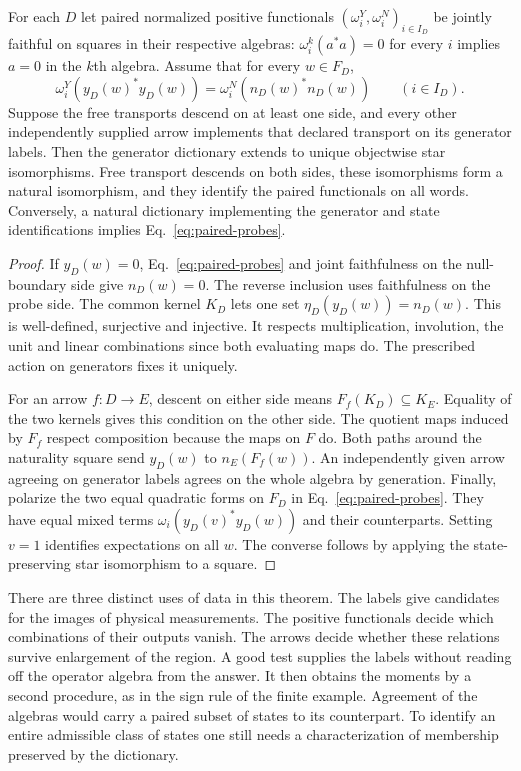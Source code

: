 \documentclass[11pt,letterpaper]{article}
\begin{document}
\begin{theorem}
\label{thm:reconstruction}
For each \(D\) let paired normalized positive functionals
\((\omega^Y_i,\omega^N_i)_{i\in I_D}\) be jointly faithful on squares in
their respective algebras: \(\omega^k_i(a^*a)=0\) for every \(i\) implies
\(a=0\) in the \(k\)th algebra. Assume that for every \(w\in F_D\),
\begin{equation}
 \omega^Y_i(y_D(w)^*y_D(w))=
 \omega^N_i(n_D(w)^*n_D(w))\qquad(i\in I_D).
 \label{eq:paired-probes}
\end{equation}
Suppose the free transports descend on at least one side, and every
other independently supplied arrow implements that declared transport
on its generator labels. Then the generator dictionary extends to unique
objectwise star isomorphisms. Free transport descends on both sides, these
isomorphisms form a natural isomorphism, and they identify the paired
functionals on all words. Conversely, a natural dictionary implementing
the generator and state identifications implies Eq.~\eqref{eq:paired-probes}.
\end{theorem}
\begin{proof}
If \(y_D(w)=0\), Eq.~\eqref{eq:paired-probes} and joint faithfulness on
the null-boundary side give \(n_D(w)=0\). The reverse inclusion uses
faithfulness on the probe side. The common kernel \(K_D\) lets one set
\(\eta_D(y_D(w))=n_D(w)\). This is well-defined, surjective and injective.
It respects multiplication, involution, the unit and linear combinations
since both evaluating maps do. The prescribed action on generators fixes
it uniquely.

For an arrow \(f:D\to E\), descent on either side means
\(F_f(K_D)\subseteq K_E\). Equality of the two kernels gives this
condition on the other side. The quotient maps induced by \(F_f\)
respect composition because the maps on \(F\) do. Both paths around the
naturality square send \(y_D(w)\) to \(n_E(F_f(w))\). An independently
given arrow agreeing on generator labels agrees on the whole algebra
by generation. Finally, polarize the two equal quadratic forms on \(F_D\)
in Eq.~\eqref{eq:paired-probes}. They have equal mixed terms
\(\omega_i(y_D(v)^*y_D(w))\) and their counterparts. Setting \(v=1\)
identifies expectations on all \(w\). The converse follows by applying
the state-preserving star isomorphism to a square.
\end{proof}

There are three distinct uses of data in this theorem. The labels
give candidates for the images of physical measurements. The positive
functionals decide which combinations of their outputs vanish. The
arrows decide whether these relations survive enlargement of the region.
A good test supplies the labels without reading off the operator algebra
from the answer. It then obtains the moments by a second procedure, as in
the sign rule of the finite example. Agreement of the algebras would
carry a paired subset of states to its counterpart. To identify an entire
admissible class of states one still needs a characterization of
membership preserved by the dictionary.
\end{document}
